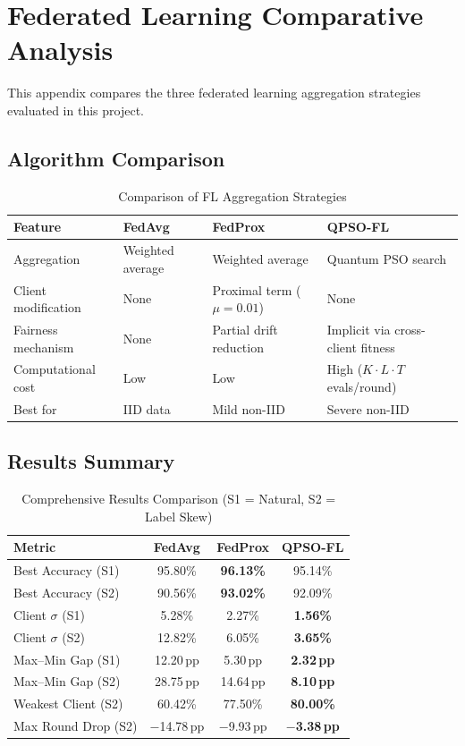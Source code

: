 \chapter{Federated Learning Comparative Analysis}
\label{app:a}

This appendix compares the three federated learning aggregation strategies evaluated in this project.

\section{Algorithm Comparison}

\begin{table}[H]
\centering
\caption{Comparison of FL Aggregation Strategies}
\label{tab:fl_compare}
\begin{tabular}{p{3cm}p{3.5cm}p{3.5cm}p{3.5cm}}
\toprule
\textbf{Feature} & \textbf{FedAvg} & \textbf{FedProx} & \textbf{QPSO-FL} \\
\midrule
Aggregation & Weighted average & Weighted average & Quantum PSO search \\
Client modification & None & Proximal term ($\mu=0.01$) & None \\
Fairness mechanism & None & Partial drift reduction & Implicit via cross-client fitness \\
Computational cost & Low & Low & High ($K \cdot L \cdot T$ evals/round) \\
Best for & IID data & Mild non-IID & Severe non-IID \\
\bottomrule
\end{tabular}
\end{table}

\section{Results Summary}

\begin{table}[H]
\centering
\caption{Comprehensive Results Comparison (S1 = Natural, S2 = Label Skew)}
\label{tab:fl_results}
\begin{tabular}{lccc}
\toprule
\textbf{Metric} & \textbf{FedAvg} & \textbf{FedProx} & \textbf{QPSO-FL} \\
\midrule
Best Accuracy (S1)     & 95.80\% & \textbf{96.13\%} & 95.14\% \\
Best Accuracy (S2)     & 90.56\% & \textbf{93.02\%} & 92.09\% \\
Client $\sigma$ (S1)   & 5.28\%  & 2.27\%  & \textbf{1.56\%} \\
Client $\sigma$ (S2)   & 12.82\% & 6.05\%  & \textbf{3.65\%} \\
Max--Min Gap (S1)      & 12.20\,pp & 5.30\,pp & \textbf{2.32\,pp} \\
Max--Min Gap (S2)      & 28.75\,pp & 14.64\,pp & \textbf{8.10\,pp} \\
Weakest Client (S2)    & 60.42\% & 77.50\% & \textbf{80.00\%} \\
Max Round Drop (S2)    & $-$14.78\,pp & $-$9.93\,pp & \textbf{$-$3.38\,pp} \\
\bottomrule
\end{tabular}
\end{table}

